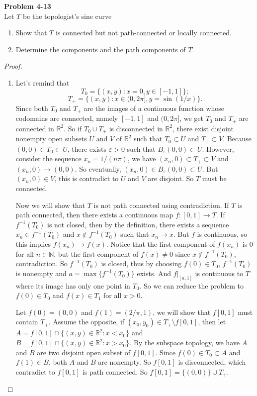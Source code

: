 \documentclass[12pt, a4paper]{article}
\theoremstyle{plain}
\newcommand{\N}{\mathbb{N}}
\newcommand{\R}{\mathbb{R}}
\def\epsilon{\varepsilon}
\newenvironment{problem}[2][Problem]
    { \begin{mdframed}[backgroundcolor=gray!20] \textbf{#1 #2} \\}
    {  \end{mdframed}}
\begin{document}
\begin{problem}{4-13}
Let $T$ be the topologist's sine curve
\begin{enumerate}[label=(\alph*)]
\item Show that $T$ is connected but not path-connected or locally connected.
\item Determine the components and the path components of $T$.
\end{enumerate}
\end{problem}
	\begin{proof}
	\hfill
	\begin{enumerate}[label=(\alph*)]
	\item Let's remind that 
	\[
	T_0=\{(x,y):x=0,y\in[-1,1]\};
	\]
	\[
	T_+=\{(x,y):x\in (0,2\pi],y=\sin\left(1/x\right)\}.
	\]
	Since both $T_0$ and $T_+$ are the images of a continuous function whose codomains are connected, namely $[-1,1]$ and $(0,2\pi]$, we get $T_0$ and $T_+$ are connected in $\R^2$. So if $T_0\cup T_+$ is disconnected in $\R^2$, there exist disjoint nonempty open subsets $U$ and $V$ of $\R^2$ such that $T_0\subset U$ and $T_+\subset V$. Because $(0,0)\in T_0\subset U$, there exists $\epsilon >0$ such that $B_\epsilon(0,0)\subset U$. However, consider the sequence $x_n = 1/(n\pi)$, we have $(x_n,0)\subset T_+\subset V$ and $(x_n,0)\rightarrow (0,0)$. So eventually, $(x_n,0)\in B_\epsilon(0,0)\subset U$. But $(x_n,0)\in V$, this is contradict to $U$ and $V$ are disjoint. So $T$ must be connected.
	
	Now we will show that $T$ is not path connected using contradiction. If $T$ is path connected, then there exists a continuous map $f:[0,1]\rightarrow T$. If $f^{-1}(T_0)$ is not closed, then by the definition, there exists a sequence $x_n\in f^{-1}(T_0)$ and $x\notin f^{-1}(T_0)$ such that $x_n\rightarrow x$. But $f$ is continuous, so this implies $f(x_n)\rightarrow f(x)$. Notice that the first component of $f(x_n)$ is $0$ for all $n\in \N$, but the first component of $f(x)\neq 0$ since $x\notin f^{-1}(T_0)$, contradiction. So $f^{-1}(T_0)$ is closed, thus by choosing $f(0)\in T_0$, $f^{-1}(T_0)$ is nonempty and $a = \max\{f^{-1}(T_0)\}$ exists. And $f|_{[a,1]}$ is continuous to $T$ where its image has only one point in $T_0$. So we can reduce the problem to $f(0)\in T_0$ and $f(x)\in T_1$ for all $x>0$.
	
	Let $f(0)=(0,0)$ and $f(1)=(2/\pi,1)$, we will show that $f[0,1]$ must contain $T_+$. Assume the opposite, if $(x_0,y_0)\in T_+\setminus f[0,1]$, then let $A=f[0,1]\cap \{(x,y)\in \R^2:x<x_0\}$ and $B=f[0,1]\cap \{(x,y)\in \R^2:x>x_0\}$. By the subspace topology, we have $A$ and $B$ are two disjoint open subset of $f[0,1]$. Since $f(0)\in T_0\subset A$ and $f(1)\in B$, both $A$ and $B$ are nonempty. So $f[0,1]$ is disconnected, which contradict to $f[0,1]$ is path connected. So $f[0,1]=\{(0,0)\}\cup T_+$.
	

\end{enumerate}
\end{proof}
\end{document}
